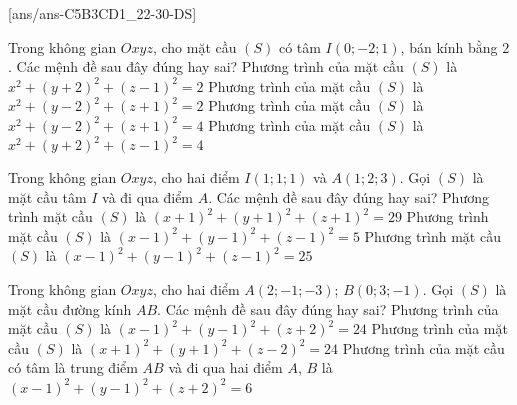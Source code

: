 \TNTF
{}[ans/ans-C5B3CD1_22-30-DS]
\begin{ex}%
	Trong không gian $Oxyz$, cho mặt cầu $(S)$ có tâm $I(0;-2;1)$, bán kính bằng $ 2 $. Các mệnh đề sau đây đúng hay sai?
	\choiceTF
	{Phương trình của mặt cầu $(S)$ là $x^2+(y+2)^2+(z-1)^2=2$}
	{Phương trình của mặt cầu $(S)$ là $x^2+(y-2)^2+(z+1)^2=2$}
	{Phương trình của mặt cầu $(S)$ là $x^2+(y-2)^2+(z+1)^2=4$}
	{\True Phương trình của mặt cầu $(S)$ là $x^2+(y+2)^2+(z-1)^2=4$}
\end{ex}
\begin{ex}%
	Trong không gian $Oxyz$, cho hai điểm $I(1;1;1)$ và $A(1;2;3)$. Gọi $(S)$ là mặt cầu tâm $ I $ và đi qua điểm $ A $. Các mệnh đề sau đây đúng hay sai?
	{Phương trình mặt cầu $ (S)$ là $(x+1)^{2}+(y+1)^{2}+(z+1)^{2}=29$}
	{\True Phương trình mặt cầu $ (S)$ là $(x-1)^{2}+(y-1)^{2}+(z-1)^{2}=5$}
	{Phương trình mặt cầu $ (S) $ là $(x-1)^2+(y-1)^2+(z-1)^2=25$}
\end{ex}
\begin{ex}%
	Trong không gian $Oxyz$, cho hai điểm $A(2;-1;-3)$; $B(0;3;-1)$. Gọi $ (S) $ là mặt cầu đường kính $ AB $. Các mệnh đề sau đây đúng hay sai?
	{Phương trình của mặt cầu $ (S) $ là $(x-1)^2+(y-1)^2+(z+2)^2=24$}
	{Phương trình của mặt cầu $ (S) $ là $(x+1)^2+(y+1)^2+(z-2)^2=24$}
	{\True Phương trình của mặt cầu có tâm là trung điểm $AB$ và đi qua hai điểm $A$, $B$ là $(x-1)^2+(y-1)^2+(z+2)^2=6$}
\end{ex}
